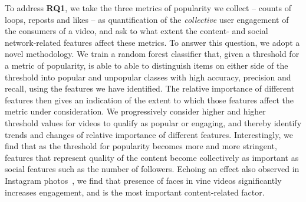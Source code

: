 


%


To address \textbf{RQ1}, we take the three metrics of popularity we collect -- counts of loops, reposts and likes -- as quantification of the \emph{collective} user engagement of the consumers of a video, and ask to what extent the content- and social network-related features affect these metrics. To answer this question, we adopt a novel methodology.
We train a random forest classifier that, given a threshold for a metric of popularity, is able to able to distinguish items on either side of the threshold into popular and unpopular classes  with high accuracy, precision and recall, using the features we have identified. The relative importance of different features then gives an indication of the extent to which those features affect the metric under consideration. We progressively consider higher and higher threshold values for videos to qualify as popular or engaging, and thereby identify trends and changes of relative importance of different features. Interestingly, we find that as the threshold for popularity becomes more and more stringent, features that represent quality of the content become collectively as important as social features such as the number of followers. Echoing an effect also observed in Instagram photos~\cite{bakhshi2014faces}, we find that presence of faces in vine videos significantly increases engagement, and is the most important content-related factor.

